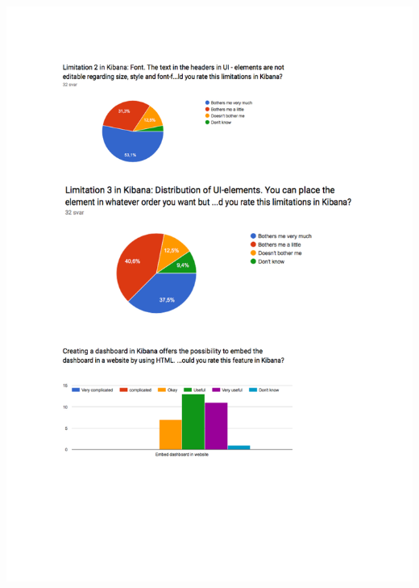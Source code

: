 \documentclass[12pt]{kththesis}
\begin{document}
\begin{appendices}
\includegraphics[width=1\textwidth]{UtvarderingSvar2}
\newpage

\end{appendices}
\end{document}
